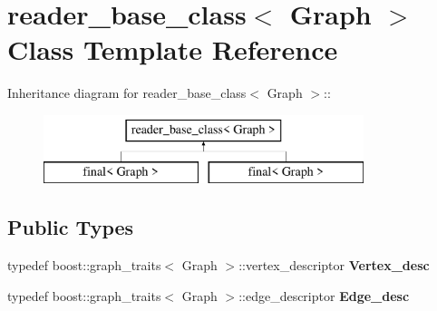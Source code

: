 \hypertarget{classreader__base__class}{
\section{reader\_\-base\_\-class$<$ Graph $>$ Class Template Reference}
\label{classreader__base__class}
}
Inheritance diagram for reader\_\-base\_\-class$<$ Graph $>$::\begin{figure}[H]
\begin{center}
\leavevmode
\includegraphics[height=2cm]{classreader__base__class}
\end{center}
\end{figure}
\subsection*{Public Types}
\begin{DoxyCompactItemize}
\item 
\hypertarget{classreader__base__class_add6b9a1702836a61d46c8484c34bc93a}{
typedef boost::graph\_\-traits$<$ Graph $>$::vertex\_\-descriptor {\bfseries Vertex\_\-desc}}
\label{classreader__base__class_add6b9a1702836a61d46c8484c34bc93a}

\item 
\hypertarget{classreader__base__class_a4f5b7d229edcf52020b99bacb402e7ba}{
typedef boost::graph\_\-traits$<$ Graph $>$::edge\_\-descriptor {\bfseries Edge\_\-desc}}
\label{classreader__base__class_a4f5b7d229edcf52020b99bacb402e7ba}

\end{DoxyCompactItemize}
